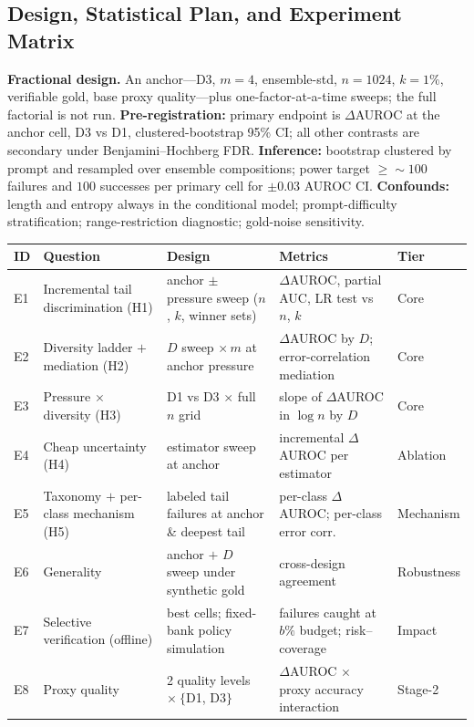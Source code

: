 \documentclass[11pt]{article}
\begin{document}
\subsection{Design, Statistical Plan, and Experiment Matrix}
\textbf{Fractional design.} An anchor---D3, $m{=}4$, ensemble-std, $n{=}1024$,
$k{=}1\%$, verifiable gold, base proxy quality---plus one-factor-at-a-time sweeps;
the full factorial is not run. \textbf{Pre-registration:} primary endpoint is
$\Delta$AUROC at the anchor cell, D3 vs D1, clustered-bootstrap 95\% CI; all other
contrasts are secondary under Benjamini--Hochberg FDR. \textbf{Inference:} bootstrap
clustered by prompt and resampled over ensemble compositions; power target
$\ge\!\sim\!100$ failures and $100$ successes per primary cell for $\pm0.03$ AUROC CI.
\textbf{Confounds:} length and entropy always in the conditional model;
prompt-difficulty stratification; range-restriction diagnostic; gold-noise
sensitivity.

\renewcommand{\arraystretch}{1.2}
\begin{table}[h]\footnotesize\centering
\begin{tabularx}{\textwidth}{@{}l l X X l@{}}
\toprule
\textbf{ID} & \textbf{Question} & \textbf{Design} & \textbf{Metrics} & \textbf{Tier}\\
\midrule
E1 & Incremental tail discrimination (H1) & anchor $\pm$ pressure sweep ($n$, $k$, winner sets) & $\Delta$AUROC, partial AUC, LR test vs $n$, $k$ & Core\\
E2 & Diversity ladder $+$ mediation (H2) & $D$ sweep $\times\, m$ at anchor pressure & $\Delta$AUROC by $D$; error-correlation mediation & Core\\
E3 & Pressure $\times$ diversity (H3) & D1 vs D3 $\times$ full $n$ grid & slope of $\Delta$AUROC in $\log n$ by $D$ & Core\\
E4 & Cheap uncertainty (H4) & estimator sweep at anchor & incremental $\Delta$AUROC per estimator & Ablation\\
E5 & Taxonomy $+$ per-class mechanism (H5) & labeled tail failures at anchor \& deepest tail & per-class $\Delta$AUROC; per-class error corr. & Mechanism\\
E6 & Generality & anchor $+$ $D$ sweep under synthetic gold & cross-design agreement & Robustness\\
E7 & Selective verification (offline) & best cells; fixed-bank policy simulation & failures caught at $b\%$ budget; risk--coverage & Impact\\
E8 & Proxy quality & 2 quality levels $\times\ \{$D1, D3$\}$ & $\Delta$AUROC $\times$ proxy accuracy interaction & Stage-2\\
\bottomrule
\end{tabularx}
\end{table}
\end{document}
